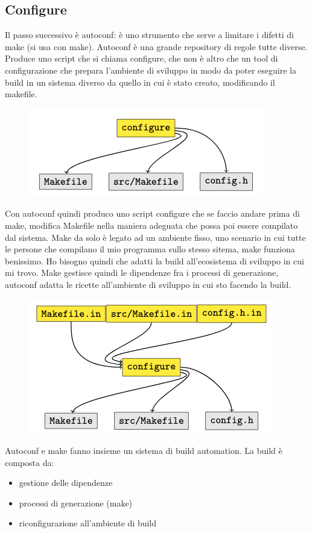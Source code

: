 \subsection{Configure}
Il passo successivo è autoconf: è uno strumento che serve a limitare i difetti di make (si usa con make). Autoconf è una grande repository di regole tutte diverse. Produce uno script che si chiama configure, che non è altro che un tool di configurazione che prepara l'ambiente di sviluppo in modo da poter eseguire la build in un sistema diverso da quello in cui è stato creato, modificando il makefile.
\begin{figure}[H]
	\centering
	 \includegraphics[scale=0.6]{img/config1.png}
\end{figure}
\noindent Con autoconf quindi produco uno script configure che se faccio andare prima di make, modifica Makefile nella maniera adeguata che possa poi essere compilato dal sistema. 
Make da solo è legato ad un ambiente fisso, uno scenario in cui tutte le persone che compilano il mio programma sullo stesso sitema, make funziona benissimo. 
Ho bisogno quindi che adatti la build all'ecosistema di sviluppo in cui mi trovo. Make gestisce quindi le dipendenze fra i processi di generazione, autoconf adatta le ricette all'ambiente di sviluppo in cui sto facendo la build. 

\begin{figure}[H]
	\centering
	 \includegraphics[scale=0.6]{img/config2.png}
\end{figure}

\noindent Autoconf e make fanno insieme un sistema di build automation. 
La build è composta da: 
\begin{itemize}
    \item gestione delle dipendenze
    \item processi di generazione (make)
    \item riconfigurazione all'ambiente di build
\end{itemize} 

